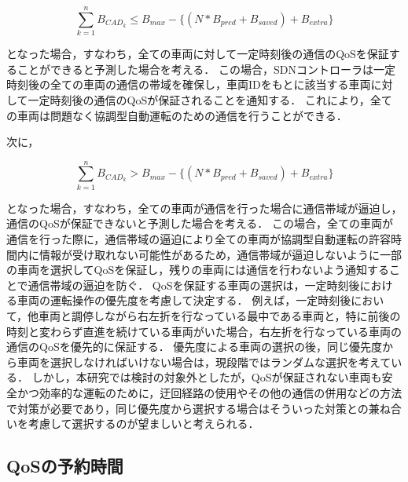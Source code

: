 \documentclass[a4paper,11pt,uplatex]{ujreport}
\begin{document}
\begin{equation}
\sum_{k=1}^{n} B_{CAD_k} \leq B_{max} - \{(N * B_{pred} + B_{saved}) + B_{extra}\}
\end{equation}

となった場合，すなわち，全ての車両に対して一定時刻後の通信のQoSを保証することができると予測した場合を考える．
この場合，SDNコントローラは一定時刻後の全ての車両の通信の帯域を確保し，車両IDをもとに該当する車両に対して一定時刻後の通信のQoSが保証されることを通知する．
これにより，全ての車両は問題なく協調型自動運転のための通信を行うことができる．\par
次に，

\begin{equation}
\sum_{k=1}^{n} B_{CAD_k} > B_{max} - \{(N * B_{pred} + B_{saved}) + B_{extra}\}
\end{equation}

となった場合，すなわち，全ての車両が通信を行った場合に通信帯域が逼迫し，通信のQoSが保証できないと予測した場合を考える．
この場合，全ての車両が通信を行った際に，通信帯域の逼迫により全ての車両が協調型自動運転の許容時間内に情報が受け取れない可能性があるため，通信帯域が逼迫しないように一部の車両を選択してQoSを保証し，残りの車両には通信を行わないよう通知することで通信帯域の逼迫を防ぐ．
QoSを保証する車両の選択は，一定時刻後における車両の運転操作の優先度を考慮して決定する．
例えば，一定時刻後において，他車両と調停しながら右左折を行なっている最中である車両と，特に前後の時刻と変わらず直進を続けている車両がいた場合，右左折を行なっている車両の通信のQoSを優先的に保証する．
優先度による車両の選択の後，同じ優先度から車両を選択しなければいけない場合は，現段階ではランダムな選択を考えている．
しかし，本研究では検討の対象外としたが，QoSが保証されない車両も安全かつ効率的な運転のために，迂回経路の使用やその他の通信の併用などの方法で対策が必要であり，同じ優先度から選択する場合はそういった対策との兼ね合いを考慮して選択するのが望ましいと考えられる．


\subsection{QoSの予約時間}
\end{document}
